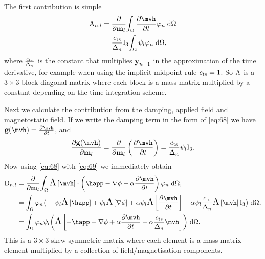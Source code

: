 {The first contribution is simple
\begin{equation}
  \begin{aligned}
    \Am_{n,l} &= \pd{}{\mv_l} \intd{ \dmdth \tbf_n } \\
           &= \jts \Idm_3 \intd{ \sbf_l \tbf_n},
  \end{aligned}
\end{equation}
where $\frac{c_\mathrm{ts}}{\Delta_{n}}$ is the constant that multiplies $\boldsymbol{\mathrm{y}}_{n+1}$ in the approximation of the time derivative, for example when using the implicit midpoint rule $c_\mathrm{ts} = 1$.
So $\mathrm{A}$ is a $3\times3$ block diagonal matrix where each block is a mass matrix multiplied by a constant depending on the time integration scheme.

Next we calculate the contribution from the damping, applied field and magnetostatic field.
If we write the damping term in the form of \cref{eq:68} we have $\gv(\mvh) = \dmdth$, and
\begin{equation}
  \label{eq:69}
  \pd{\gv(\mvh)}{\mv_l} = \pd{}{\mv_l} \left(\pd{\mvh}{t} \right) = \jts \sbf_l \Idm_3.
\end{equation}
Now using \cref{eq:68} with \cref{eq:69} we immediately obtain
\begin{equation}
  \begin{aligned}
    \Dm_{n,l} &= \pd{}{\mv_l} \intd{  \skewm{\mvh} \cdot
      \left( \happ - \grad \phi - \dampc \dmdth
      \right) \tbf_n}, \\
    &= \int_\magd \tbf_n \big( -\sbf_l\skewm{\happ} + \sbf_l\skewm{\grad \phi} + \dampc\sbf_l \skewm{\dmdth} - \dampc\sbf_l \jts \skewm{\mvh} \Idm_3
    \big) \d\magd, \\
    &= \intd{ \tbf_n \sbf_l \bigb{ \skewm{-\happ + \grad \phi
          + \dampc \dmdth - \dampc \jts \mvh}}}.
    \label{eq:field-damping-jacobian}
  \end{aligned}
\end{equation}
This is a $3\times3$ skew-symmetric matrix where each element is a mass matrix element multiplied by a collection of field/magnetisation components.

}
